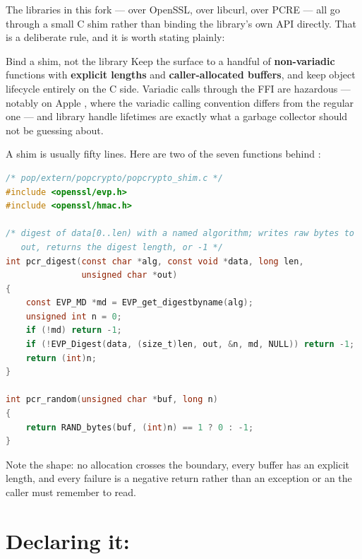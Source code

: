 The libraries in this fork ---  over OpenSSL, 
over libcurl,  over PCRE --- all go through a small C shim
rather than binding the library's own API directly. That is a
deliberate rule, and it is worth stating plainly:

\begin{callout}{Bind a shim, not the library}
Keep the  surface to a handful of \textbf{non-variadic}
functions with \textbf{explicit lengths} and \textbf{caller-allocated
buffers}, and keep object lifecycle entirely on the C side. Variadic calls
through the FFI are hazardous --- notably on Apple , where the
variadic calling convention differs from the regular one --- and library
handle lifetimes are exactly what a garbage collector should not be guessing
about.
\end{callout}

A shim is usually fifty lines. Here are two of the seven functions behind
:

\begin{lstlisting}[language=C]
/* pop/extern/popcrypto/popcrypto_shim.c */
#include <openssl/evp.h>
#include <openssl/hmac.h>

/* digest of data[0..len) with a named algorithm; writes raw bytes to
   out, returns the digest length, or -1 */
int pcr_digest(const char *alg, const void *data, long len,
               unsigned char *out)
{
    const EVP_MD *md = EVP_get_digestbyname(alg);
    unsigned int n = 0;
    if (!md) return -1;
    if (!EVP_Digest(data, (size_t)len, out, &n, md, NULL)) return -1;
    return (int)n;
}

int pcr_random(unsigned char *buf, long n)
{
    return RAND_bytes(buf, (int)n) == 1 ? 0 : -1;
}
\end{lstlisting}

Note the shape: no allocation crosses the boundary, every buffer has an
explicit length, and every failure is a negative return rather than an
exception or an  the caller must remember to read.

\section{Declaring it: }


